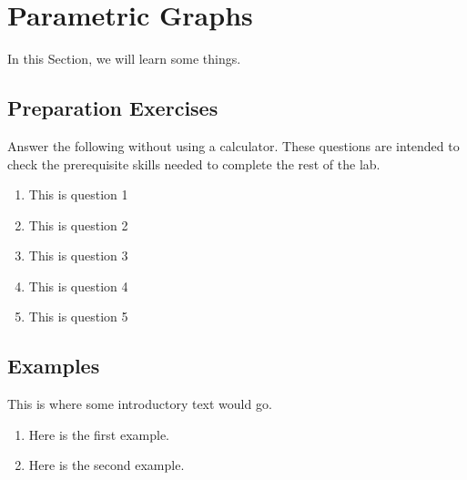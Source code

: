 
\section{Parametric Graphs} \label{section-parametric-graphs}
In this Section, we will learn some things.
\subsection*{Preparation Exercises} \label{preparation-exercises-section-parametric-graphs}



\begin{myPrep}
Answer the following without using a calculator. These questions are intended to check the prerequisite skills needed to complete the rest of the lab.
	\begin{enumerate}
		\item This is question 1
		\vfill
		\item This is question 2
		\vfill
		\item This is question 3
		\vfill
		\item This is question 4
		\vfill
		\item This is question 5
		\vfill
	\end{enumerate}
\end{myPrep}
\vfill


\newpage

\subsection*{Examples} \label{examples-section-parametric-graphs}

This is where some introductory text would go.

\begin{myExample}
\begin{enumerate}

\item Here is the first example.
\vfill

\item Here is the second example.
\vfill

\end{enumerate}
\end{myExample}


